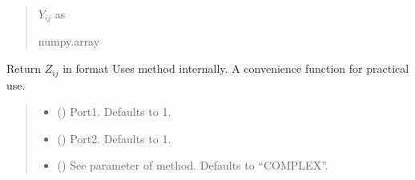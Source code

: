 \documentclass[letterpaper,10pt,english]{sphinxmanual}
\begin{document}
\begin{fulllineitems}
\begin{fulllineitems}
\begin{quote}
\begin{description}
\begin{itemize}
\end{itemize}

\sphinxAtStartPar
\(Y_{i j}\) as 

\sphinxAtStartPar
numpy.array

\end{description}\end{quote}

\end{fulllineitems}


\begin{fulllineitems}
\label{\detokenize{touchstone:touchstone.spfile.Z}}
\pysigstartsignatures
{}
\pysigstopsignatures
\sphinxAtStartPar
Return \(Z_{i j}\) in format 
Uses  method internally. A convenience function for practical use.
\begin{quote}\begin{description}
\begin{itemize}
\item {}
\sphinxAtStartPar
{} (\sphinxstyleliteralemphasis{\sphinxupquote{, }}) \textendash{} Port\sphinxhyphen{}1. Defaults to 1.

\item {}
\sphinxAtStartPar
{} (\sphinxstyleliteralemphasis{\sphinxupquote{, }}) \textendash{} Port\sphinxhyphen{}2. Defaults to 1.

\item {}
\sphinxAtStartPar
{} (\sphinxstyleliteralemphasis{\sphinxupquote{, }}) \textendash{} See  parameter of  method. Defaults to “COMPLEX”.


\end{itemize}
\end{description}
\end{quote}
\end{fulllineitems}
\end{fulllineitems}
\end{document}
